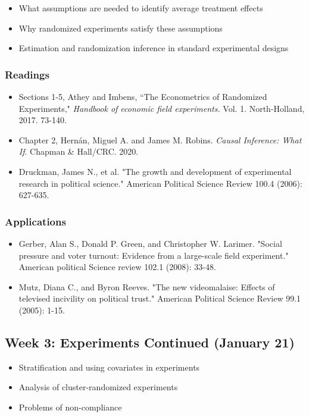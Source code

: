 \documentclass[11pt, article, oneside]{memoir}
\theoremstyle{Assumption}
\begin{document}
\begin{itemize}
\item What assumptions are needed to identify average treatment effects
\item Why randomized experiments satisfy these assumptions
\item Estimation and randomization inference in standard experimental designs
\end{itemize}

\subsubsection*{Readings}

\begin{itemize}
\item Sections 1-5, Athey and Imbens, ``The Econometrics of Randomized Experiments,"  \textit{Handbook of economic field experiments.} Vol. 1. North-Holland, 2017. 73-140. 
\item Chapter 2, Hern\'an, Miguel A. and  James M. Robins. \textit{Causal Inference: What If}.  Chapman \& Hall/CRC. 2020.
\item Druckman, James N., et al. "The growth and development of experimental research in political science." American Political Science Review 100.4 (2006): 627-635.
\end{itemize}

\subsubsection*{Applications}

\begin{itemize}
\item Gerber, Alan S., Donald P. Green, and Christopher W. Larimer. "Social pressure and voter turnout: Evidence from a large-scale field experiment." American political Science review 102.1 (2008): 33-48.
\item Mutz, Diana C., and Byron Reeves. "The new videomalaise: Effects of televised incivility on political trust." American Political Science Review 99.1 (2005): 1-15.
\end{itemize}

\subsection{Week 3: Experiments Continued (January 21)}

\begin{itemize}
\item Stratification and using covariates in experiments
\item Analysis of cluster-randomized experiments
\item Problems of non-compliance
\end{itemize}
\end{document}
